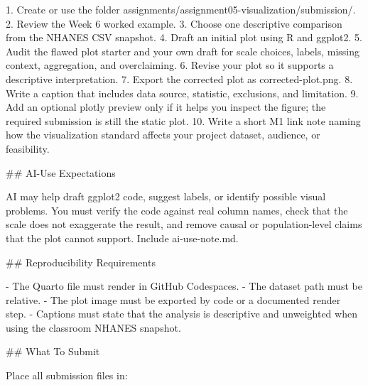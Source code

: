 \documentclass[
  letterpaper,
  DIV=11,
  numbers=noendperiod,
  oneside]{scrreprt}
\newenvironment{Shaded}{\begin{snugshade}}{\end{snugshade}}
\newcommand{\FunctionTok}[1]{\textcolor[rgb]{0.28,0.35,0.67}{#1}}
\newcommand{\InformationTok}[1]{\textcolor[rgb]{0.37,0.37,0.37}{#1}}
\newcommand{\NormalTok}[1]{\textcolor[rgb]{0.00,0.23,0.31}{#1}}
\newcommand{\SpecialStringTok}[1]{\textcolor[rgb]{0.13,0.47,0.30}{#1}}
\begin{document}
\begin{Shaded}
\begin{Highlighting}[numbers=left,,]
\SpecialStringTok{1. }\NormalTok{Create or use the folder }\InformationTok{\textasciigrave{}assignments/assignment05{-}visualization/submission/\textasciigrave{}}\NormalTok{.}
\SpecialStringTok{2. }\NormalTok{Review the Week 6 worked example.}
\SpecialStringTok{3. }\NormalTok{Choose one descriptive comparison from the NHANES CSV snapshot.}
\SpecialStringTok{4. }\NormalTok{Draft an initial plot using R and }\InformationTok{\textasciigrave{}ggplot2\textasciigrave{}}\NormalTok{.}
\SpecialStringTok{5. }\NormalTok{Audit the flawed plot starter and your own draft for scale choices, labels, missing context, aggregation, and overclaiming.}
\SpecialStringTok{6. }\NormalTok{Revise your plot so it supports a descriptive interpretation.}
\SpecialStringTok{7. }\NormalTok{Export the corrected plot as }\InformationTok{\textasciigrave{}corrected{-}plot.png\textasciigrave{}}\NormalTok{.}
\SpecialStringTok{8. }\NormalTok{Write a caption that includes data source, statistic, exclusions, and limitation.}
\SpecialStringTok{9. }\NormalTok{Add an optional }\InformationTok{\textasciigrave{}plotly\textasciigrave{}}\NormalTok{ preview only if it helps you inspect the figure; the required submission is still the static plot.}
\SpecialStringTok{10. }\NormalTok{Write a short M1 link note naming how the visualization standard affects your project dataset, audience, or feasibility.}

\FunctionTok{\#\# AI{-}Use Expectations}

\NormalTok{AI may help draft }\InformationTok{\textasciigrave{}ggplot2\textasciigrave{}}\NormalTok{ code, suggest labels, or identify possible visual problems. You must verify the code against real column names, check that the scale does not exaggerate the result, and remove causal or population{-}level claims that the plot cannot support. Include }\InformationTok{\textasciigrave{}ai{-}use{-}note.md\textasciigrave{}}\NormalTok{.}

\FunctionTok{\#\# Reproducibility Requirements}

\SpecialStringTok{{-} }\NormalTok{The Quarto file must render in GitHub Codespaces.}
\SpecialStringTok{{-} }\NormalTok{The dataset path must be relative.}
\SpecialStringTok{{-} }\NormalTok{The plot image must be exported by code or a documented render step.}
\SpecialStringTok{{-} }\NormalTok{Captions must state that the analysis is descriptive and unweighted when using the classroom NHANES snapshot.}

\FunctionTok{\#\# What To Submit}

\NormalTok{Place all submission files in:}


\end{Highlighting}
\end{Shaded}
\end{document}
